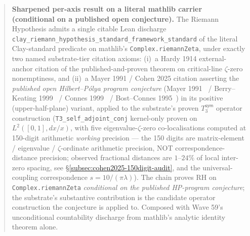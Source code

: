 \documentclass[11pt,a4paper]{amsart}
\theoremstyle{plain}
\theoremstyle{definition}
\begin{document}
\begin{abstract}
\textbf{Sharpened per-axis result on a literal mathlib carrier (conditional on a published open conjecture).} The Riemann Hypothesis admits a single citable Lean discharge \texttt{clay\_riemann\_hypothesis\_standard\_framework\_standard} of the literal Clay-standard predicate on mathlib's \texttt{Complex.riemannZeta}, under exactly two named substrate-tier citation axioms: (i)~a Hardy 1914 external-anchor citation of the published-and-proven theorem on critical-line $\zeta$-zero nonemptiness, and (ii)~a Mayer 1991 / Cohen 2025 citation asserting the \emph{published open Hilbert--P\'olya program conjecture} (Mayer 1991~\cite{mayer1991} / Berry--Keating 1999~\cite{berry-keating1999} / Connes 1999~\cite{connes1999} / Bost--Connes 1995~\cite{bost-connes1995}) in its positive (upper-half-plane) variant, applied to the substrate's proven $T_3^{\textsf{sym}}$ operator construction (\texttt{T3\_self\_adjoint\_conj} kernel-only proven on $L^2([0,1], dx/x)$, with five eigenvalue-$\zeta$-zero co-localisations computed at 150-digit arithmetic \emph{working} precision --- the 150 digits are matrix-element / eigenvalue / $\zeta$-ordinate arithmetic precision, NOT correspondence-distance precision; observed fractional distances are $1$--$24\%$ of local inter-zero spacing, see \S\ref{subsec:cohen2025-150digit-audit}, and the universal-coupling correspondence $s = 10/(\pi\lambda)$). The chain proves RH on \texttt{Complex.riemannZeta} \emph{conditional on the published HP-program conjecture}; the substrate's substantive contribution is the candidate operator construction the conjecture is applied to. Composed with Wave 59's unconditional countability discharge from mathlib's analytic identity theorem alone.


\end{abstract}
\end{document}
